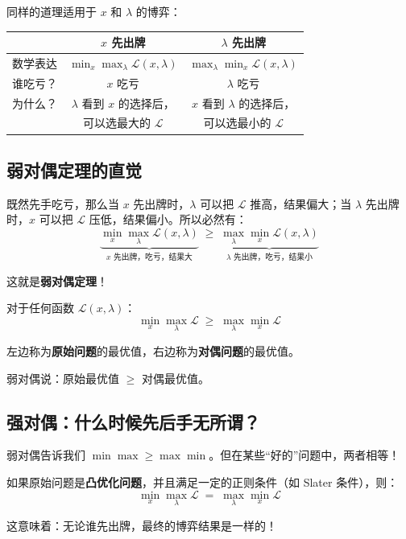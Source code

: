 同样的道理适用于 $x$ 和 $\lambda$ 的博弈：

\begin{center}
\renewcommand{\arraystretch}{1.5}
\begin{tabular}{c|c|c}
\toprule
 & \textbf{$x$ 先出牌} & \textbf{$\lambda$ 先出牌} \\
\midrule
数学表达 & $\displaystyle\min_x \max_\lambda \mathcal{L}(x,\lambda)$ & $\displaystyle\max_\lambda \min_x \mathcal{L}(x,\lambda)$ \\
\midrule
谁吃亏？ & $x$ 吃亏 & $\lambda$ 吃亏 \\
\midrule
为什么？ & $\lambda$ 看到 $x$ 的选择后， & $x$ 看到 $\lambda$ 的选择后， \\
 & 可以选最大的 $\mathcal{L}$ & 可以选最小的 $\mathcal{L}$ \\
\bottomrule
\end{tabular}
\end{center}

\subsection{弱对偶定理的直觉}

既然先手吃亏，那么当 $x$ 先出牌时，$\lambda$ 可以把 $\mathcal{L}$ 推高，结果偏大；当 $\lambda$ 先出牌时，$x$ 可以把 $\mathcal{L}$ 压低，结果偏小。所以必然有：
\[
\underbrace{\min_x \max_\lambda \mathcal{L}(x,\lambda)}_{x\text{ 先出牌，吃亏，结果大}} \;\geq\; \underbrace{\max_\lambda \min_x \mathcal{L}(x,\lambda)}_{\lambda\text{ 先出牌，吃亏，结果小}}
\]

这就是\textbf{弱对偶定理}！

\begin{keytheorem}[title=弱对偶定理]
对于任何函数 $\mathcal{L}(x, \lambda)$：
\[
\min_x \max_\lambda \mathcal{L} \;\geq\; \max_\lambda \min_x \mathcal{L}
\]

左边称为\textbf{原始问题}的最优值，右边称为\textbf{对偶问题}的最优值。

弱对偶说：原始最优值 $\geq$ 对偶最优值。
\end{keytheorem}

\subsection{强对偶：什么时候先后手无所谓？}

弱对偶告诉我们 $\min\max \geq \max\min$。但在某些“好的”问题中，两者相等！

\begin{keytheorem}[title=强对偶定理（非正式版）]
如果原始问题是\textbf{凸优化问题}，并且满足一定的正则条件（如 Slater 条件），则：
\[
\min_x \max_\lambda \mathcal{L} \;=\; \max_\lambda \min_x \mathcal{L}
\]

这意味着：无论谁先出牌，最终的博弈结果是一样的！
\end{keytheorem}

